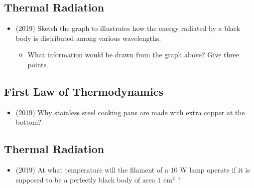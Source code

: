 \documentclass{article}
\begin{document}
\subsection{Thermal Radiation}
\begin{itemize}
\item (2019)  Sketch the graph to illustrates how the energy radiated by a black body is distributed among various wavelengths. 
 \begin{itemize}
\item What information would be drawn from the graph above? Give three points.
\end{itemize}
\end{itemize}

\subsection{First Law of Thermodynamics}
\begin{itemize}
\item (2019)  Why stainless steel cooking pans are made with extra copper at the bottom?
\end{itemize}

\subsection{Thermal Radiation}
\begin{itemize}
\item (2019)  At what temperature will the filament of a $ 10$ W lamp operate if it is supposed to be a perfectly black body of area  $ 1 $ cm$ ^{2}$ ? 
\end{itemize}
\end{document}
